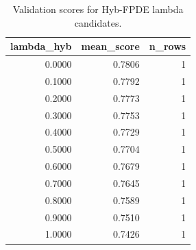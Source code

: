 \begin{table}[t]
\caption{Validation scores for Hyb-FPDE lambda candidates.}
\label{tab:lambda_distribution_computed}
\centering
\begin{tabular}{rrr}
\toprule
lambda\_hyb & mean\_score & n\_rows \\
\midrule
0.0000 & 0.7806 & 1 \\
0.1000 & 0.7792 & 1 \\
0.2000 & 0.7773 & 1 \\
0.3000 & 0.7753 & 1 \\
0.4000 & 0.7729 & 1 \\
0.5000 & 0.7704 & 1 \\
0.6000 & 0.7679 & 1 \\
0.7000 & 0.7645 & 1 \\
0.8000 & 0.7589 & 1 \\
0.9000 & 0.7510 & 1 \\
1.0000 & 0.7426 & 1 \\
\bottomrule
\end{tabular}

\end{table}
